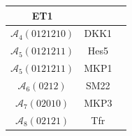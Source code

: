 \begin{table}[!t]
\begin{tabular}{|c|c||c|}
ET1

&


\\ \hline

$\mathcal{A}_{4}(0121210)$

&

DKK1

&


\\ \hline

$\mathcal{A}_{5}(0121211)$

&

Hes5


&


\\ \hline

$\mathcal{A}_{5}(0121211)$

&

MKP1


&


\\ \hline

$\mathcal{A}_{6}(0212)$

&

SM22


&


\\ \hline

$\mathcal{A}_{7}(02010)$

&

MKP3


&


\\ \hline

$\mathcal{A}_{8}(02121)$

&

Tfr


&


\\ \hline

 
\end{tabular}
\end{table}








%
%

